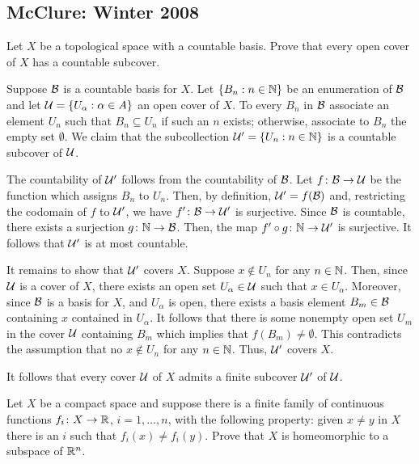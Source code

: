 \subsection{McClure: Winter 2008}
\setcounter{exercise}{0}

\begin{problem}
  Let \(X\) be a topological space with a countable basis. Prove that every
  open cover of \(X\) has a countable subcover.
\end{problem}
\begin{solution}
  Suppose \(\mathcal{B}\) is a countable basis for \(X\). Let
  \(\{B_n:n\in\mathbb{N}\}\) be an enumeration of \(\mathcal{B}\) and let
  \(\mathcal{U}=\{U_\alpha:\alpha\in A\}\) an open cover of \(X\). To every
  \(B_n\) in \(\mathcal{B}\) associate an element \(U_n\) such that
  \(B_n\subseteq U_n\) if such an \(n\) exists; otherwise, associate to
  \(B_n\) the empty set \(\emptyset\). We claim that the subcollection
  \(\mathcal{U}'=\{U_n:n\in\mathbb{N}\}\) is a countable subcover of \(\mathcal{U}\).

  The countability of \(\mathcal{U}'\) follows from the countability of
  \(\mathcal{B}\). Let \(f\colon\mathcal{B}\to\mathcal{U}\) be the function which assigns
  \(B_n\) to \(U_n\). Then, by definition, \(\mathcal{U}'=f(\mathcal{B})\) and,
  restricting the codomain of \(f\) to \(\mathcal{U}'\), we have
  \(f'\colon\mathcal{B}\to\mathcal{U}'\) is surjective. Since \(\mathcal{B}\) is countable,
  there exists a surjection \(g\colon\mathbb{N}\to\mathcal{B}\). Then, the map
  \(f'\circ g\colon\mathbb{N}\to\mathcal{U}'\) is surjective. It follows that
  \(\mathcal{U}'\) is at most countable.

  It remains to show that \(\mathcal{U}'\) covers \(X\). Suppose \(x\notin U_n\)
  for any \(n\in\mathbb{N}\). Then, since \(\mathcal{U}\) is a cover of \(X\), there
  exists an open set \(U_\alpha\in\mathcal{U}\) such that \(x\in
  U_\alpha\). Moreover, since \(\mathcal{B}\) is a basis for \(X\), and
  \(U_\alpha\) is open, there exists a basis element \(B_m\in\mathcal{B}\)
  containing \(x\) contained in \(U_\alpha\). It follows that there is some
  nonempty open set \(U_m\) in the cover \(\mathcal{U}\) containing \(B_m\) which
  implies that \(f(B_m)\neq\emptyset\). This contradicts the assumption
  that no \(x\notin U_n\) for any \(n\in\mathbb{N}\). Thus, \(\mathcal{U}'\) covers
  \(X\).

  It follows that every cover \(\mathcal{U}\) of \(X\) admits a finite subcover
  \(\mathcal{U}'\) of \(\mathcal{U}\).
\end{solution}

\begin{problem}
  Let \(X\) be a compact space and suppose there is a finite family of
  continuous functions \(f_i\colon X\to\mathbb{R}\), \(i=1,\dotsc,n\), with the
  following property: given \(x\neq y\) in \(X\) there is an \(i\) such
  that \(f_i(x)\neq f_i(y)\). Prove that \(X\) is homeomorphic to a
  subspace of \(\mathbb{R}^n\).
\end{problem}
\begin{solution}
\end{solution}

